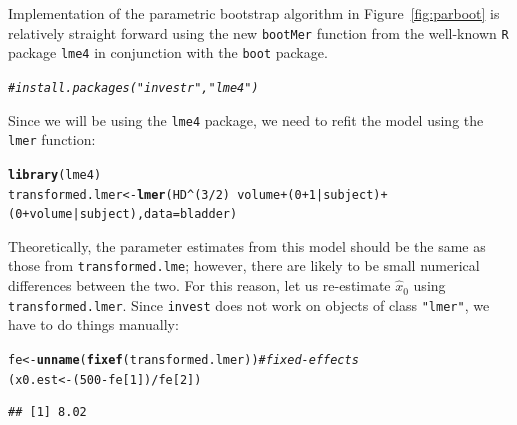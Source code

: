 \documentclass{article}\usepackage[]{graphicx}\usepackage[]{color}
\makeatletter
\newcommand{\hlnum}[1]{\textcolor[rgb]{0.686,0.059,0.569}{#1}}%
\newcommand{\hlcom}[1]{\textcolor[rgb]{0.678,0.584,0.686}{\textit{#1}}}%
\newcommand{\hlopt}[1]{\textcolor[rgb]{0,0,0}{#1}}%
\newcommand{\hlstd}[1]{\textcolor[rgb]{0.345,0.345,0.345}{#1}}%
\newcommand{\hlkwb}[1]{\textcolor[rgb]{0.69,0.353,0.396}{#1}}%
\newcommand{\hlkwc}[1]{\textcolor[rgb]{0.333,0.667,0.333}{#1}}%
\newcommand{\hlkwd}[1]{\textcolor[rgb]{0.737,0.353,0.396}{\textbf{#1}}}%
\newenvironment{kframe}{%
 \def\at@end@of@kframe{}%
 \ifinner\ifhmode%
  \def\at@end@of@kframe{\end{minipage}}%
  \begin{minipage}{\columnwidth}%
 \fi\fi%
 \def\FrameCommand##1{\hskip\@totalleftmargin \hskip-\fboxsep
 \colorbox{shadecolor}{##1}\hskip-\fboxsep
     \hskip-\linewidth \hskip-\@totalleftmargin \hskip\columnwidth}%
 \MakeFramed {\advance\hsize-\width
   \@totalleftmargin\z@ \linewidth\hsize
   \@setminipage}}%
 {\par\unskip\endMakeFramed%
 \at@end@of@kframe}
\newenvironment{knitrout}{}{} %
\makeatother
\begin{document}
Implementation of the parametric bootstrap algorithm in Figure~\ref{fig:parboot} is relatively straight forward using the new \texttt{bootMer} function from the well-known \texttt{R} package \texttt{lme4} \citep{bates-lme4-2014} in conjunction with the \texttt{boot} package.

\begin{knitrout}
\color{fgcolor}\begin{kframe}
\begin{alltt}
\hlcom{# install.packages("investr", "lme4")}
\end{alltt}
\end{kframe}
\end{knitrout}

Since we will be using the \texttt{lme4} package, we need to refit the model using the \texttt{lmer} function:
\begin{knitrout}
\color{fgcolor}\begin{kframe}
\begin{alltt}
\hlkwd{library}\hlstd{(lme4)}
\hlstd{transformed.lmer} \hlkwb{<-} \hlkwd{lmer}\hlstd{(HD} \hlopt{^} \hlstd{(}\hlnum{3} \hlopt{/} \hlnum{2}\hlstd{)} \hlopt{~} \hlstd{volume} \hlopt{+} \hlstd{(}\hlnum{0} \hlopt{+} \hlnum{1} \hlopt{|} \hlstd{subject)} \hlopt{+}
                           \hlstd{(}\hlnum{0} \hlopt{+} \hlstd{volume} \hlopt{|} \hlstd{subject),} \hlkwc{data} \hlstd{= bladder)}
\end{alltt}
\end{kframe}
\end{knitrout}
Theoretically, the parameter estimates from this model should be the same as those from \texttt{transformed.lme}; however, there are likely to be small numerical differences between the two.  For this reason, let us re-estimate $\widehat{x}_0$ using \texttt{transformed.lmer}.  Since \texttt{invest} does not work on objects of class \texttt{"lmer"}, we have to do things manually:
\begin{knitrout}
\color{fgcolor}\begin{kframe}
\begin{alltt}
\hlstd{fe} \hlkwb{<-} \hlkwd{unname}\hlstd{(}\hlkwd{fixef}\hlstd{(transformed.lmer))}  \hlcom{# fixed-effects}
\hlstd{(x0.est} \hlkwb{<-} \hlstd{(}\hlnum{500} \hlopt{-} \hlstd{fe[}\hlnum{1}\hlstd{])} \hlopt{/} \hlstd{fe[}\hlnum{2}\hlstd{])}
\end{alltt}
\begin{verbatim}
## [1] 8.02
\end{verbatim}
\end{kframe}
\end{knitrout}
\end{document}
